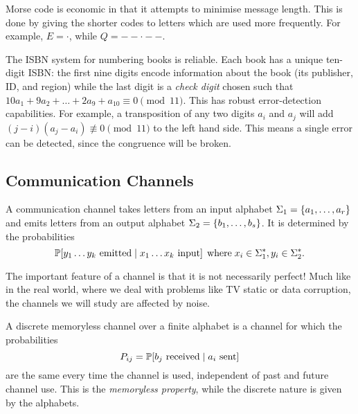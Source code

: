 \documentclass{article}
\begin{document}
\begin{remark}
	\label{economy-and-reliability}
    Morse code is economic in that it attempts to minimise message length. This is done by giving the shorter codes to letters which are used more frequently. For example, $E = \cdot$, while $Q = -- \cdot --$.

	The ISBN system for numbering books is reliable. Each book has a unique ten-digit ISBN: the first nine digits encode information about the book (its publisher, ID, and region) while the last digit is a \textit{check digit} chosen such that $10 a_1 + 9 a_2 + \dots + 2a_9 + a_{10} \equiv 0 \pmod{11}$.
	This has robust error-detection capabilities. For example, a transposition of any two digits $a_{i}$ and $a_{j}$ will add $(j-i)(a_{j} - a_i) \not\equiv 0 \pmod{11}$ to the left hand side. This means a single error can be detected, since the congruence will be broken.
\end{remark}


\subsection{Communication Channels}

\begin{definition}[Channel]
	\label{channel-definition}
    A communication channel takes letters from an input alphabet $\Sigma_1 = \set{a_1, \dots, a_r}$ and emits letters from an output alphabet $\Sigma_2 = \set{b_1, \dots, b_s}$. It is determined by the probabilities
	\[
	\P[y_1\dots y_k \text{ emitted} \mid x_1\dots x_k \text{ input}] \where x_i \in \Sigma_1^*, y_i \in \Sigma_2^*.
	\]
\end{definition}

\begin{note}
	The important feature of a channel is that it is not necessarily perfect! Much like in the real world, where we deal with problems like TV static or data corruption, the channels we will study are affected by noise.
\end{note}

\begin{definition}
	\label{discrete-memoryless-channel}
    A discrete memoryless channel over a finite alphabet is a channel for which the probabilities
	\[
	P_{ij} = \P[b_j \text{ received} \mid a_i \text{ sent}]
	\]
	are the same every time the channel is used, independent of past and future channel use. This is the \textit{memoryless property}, while the discrete nature is given by the alphabets.
\end{definition}
\end{document}
